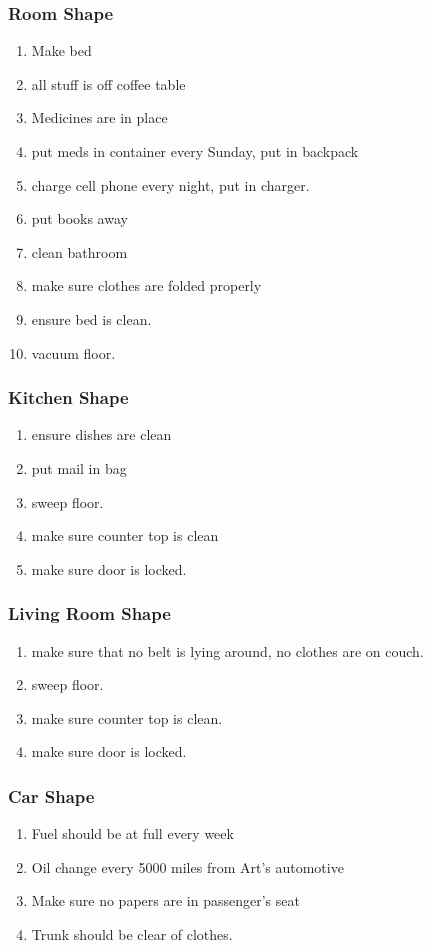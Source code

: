 \begin{frame} 
\frametitle{Room Shape} 
\begin{enumerate}
\item \small Make bed
\item \small all stuff is off coffee table
\item \small Medicines are in place
\item \small put meds in container every Sunday, put in backpack
\item \small charge cell phone every night, put in charger. 
\item \small put books away 
\item \small clean bathroom 
\item \small make sure clothes are folded properly
\item \small ensure bed is clean.
\item \small vacuum floor. 
\end{enumerate}
\end{frame} 

\begin{frame} 
\frametitle{Kitchen Shape} 
\begin{enumerate}
\item \small ensure dishes are clean
\item \small put mail in bag
\item \small sweep floor. 
\item \small make sure counter top is clean
\item \small make sure door is locked. 
\end{enumerate}
\end{frame} 

\begin{frame} 
\frametitle{Living Room Shape} 
\begin{enumerate}
\item \small make sure that no belt is lying 
around, no clothes are on couch. 
\item \small sweep floor. 
\item \small make sure counter top is clean. 
\item \small make sure door is locked. 
\end{enumerate}
\end{frame} 

\begin{frame} 
\frametitle{Car Shape} 
\begin{enumerate}
\item \small Fuel should be at full every week
\item \small Oil change every 5000 miles from Art's automotive 
\item \small Make sure no papers are in passenger's seat 
\item \small Trunk should be clear of clothes. 
\end{enumerate}
\end{frame} 

